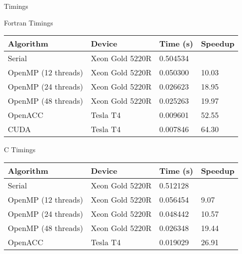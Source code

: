\documentclass[10pt,t]{beamer}
\begin{document}
\begin{frame}[allowframebreaks]{Timings}
  \begin{exampleblock}{Fortran Timings}
    {\scriptsize
    \begin{center}
      \begin{tabular}{|bbbb|}
        \hline
        \rowcolor{lublue}Algorithm & Device & Time (s) & Speedup \\
        \hline
         Serial & Xeon Gold 5220R & 0.504534 & \\
         \hline
         OpenMP (12 threads) & Xeon Gold 5220R & 0.050300 & 10.03 \\
         OpenMP (24 threads) & Xeon Gold 5220R & 0.026623 & 18.95 \\
         OpenMP (48 threads) & Xeon Gold 5220R & 0.025263 & 19.97 \\
         \hline
         OpenACC & Tesla T4 & 0.009601 & 52.55 \\
         \hline
         CUDA & Tesla T4 & 0.007846 & 64.30 \\
        \hline
      \end{tabular}
    \end{center}
    }
  \end{exampleblock}
  \begin{exampleblock}{C Timings}
    {\scriptsize
    \begin{center}
      \begin{tabular}{|bbbb|}
        \hline
        \rowcolor{lublue}Algorithm & Device & Time (s) & Speedup \\
        \hline
         Serial & Xeon Gold 5220R & 0.512128 & \\
         \hline
         OpenMP (12 threads) & Xeon Gold 5220R & 0.056454 &  9.07 \\
         OpenMP (24 threads) & Xeon Gold 5220R & 0.048442 & 10.57 \\
         OpenMP (48 threads) & Xeon Gold 5220R & 0.026348 & 19.44 \\
         \hline
         OpenACC & Tesla T4 & 0.019029 & 26.91 \\
         \hline
      \end{tabular}
    \end{center}
    }
  \end{exampleblock}
 \end{frame}
\end{document}
